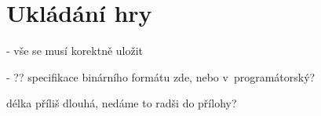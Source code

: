 
\section{Ukládání hry}

- vše se musí korektně uložit

- ?? specifikace binárního formátu zde, nebo v~programátorský?

délka příliš dlouhá, nedáme to radši do přílohy?